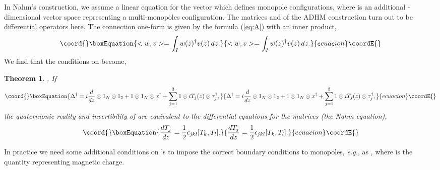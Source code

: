 \documentclass[a4paper,10pt]{article}
\newtheorem{thm}{Theorem}
\providecommand{\eg}{\textit{e.g.}}
\begin{document}
In Nahm's construction, we assume a linear equation \coordHE{} for the vector \coordHE{} which defines monopole configurations, where \coordHE{} is an additional \coordHE{}-dimensional vector space representing a multi-monopoles configuration.
The matrices \myHighlight{$\Delta$}\coordHE{} and \myHighlight{$\Delta^\dagger$}\coordHE{} of the ADHM construction turn out to be differential operators here.
The connection one-form is given by the formula (\ref{eq:A}) with an \coordHE{} inner product,  
\begin{equation}\coord{}\boxEquation{
<w,v>=\int_I w(z)^\dagger v(z)\,dz. 
}{
<w,v>=\int_I w(z)^\dagger v(z)\,dz. 
}{ecuacion}\coordE{}\end{equation}
We find that the conditions on \coordHE{} become,
\begin{thm}{\rm \cite{Hit83}, \cite{Nahm82}}
If
\begin{equation}\coord{}\boxEquation{
\Delta^\dagger=i\frac{d}{dz}\otimes1_N\otimes1_2+1\otimes1_N\otimes x^\dagger+\sum_{j=1}^31\otimes iT_j(z)\otimes\tau_j^\dagger,
}{
\Delta^\dagger=i\frac{d}{dz}\otimes1_N\otimes1_2+1\otimes1_N\otimes x^\dagger+\sum_{j=1}^31\otimes iT_j(z)\otimes\tau_j^\dagger,
}{ecuacion}\coordE{}\end{equation}
 the quaternionic reality and invertibility of \myHighlight{$\Delta^\dagger\Delta$}\coordHE{} are equivalent to the differential equations for the matrices \coordHE{} (the Nahm equation),
\begin{equation}\coord{}\boxEquation{
\frac{dT_j}{dz}=\frac{1}{2}\epsilon_{jkl}[T_k,T_l]. \label{Nahmeq}
}{
\frac{dT_j}{dz}=\frac{1}{2}\epsilon_{jkl}[T_k,T_l]. }{ecuacion}\coordE{}\end{equation}
\end{thm}
In practice we need some additional conditions on \coordHE{}'s  to impose the correct boundary conditions to monopoles, \eg, \coordHE{} as \coordHE{}, where \coordHE{} is the quantity representing magnetic charge.
\end{document}
